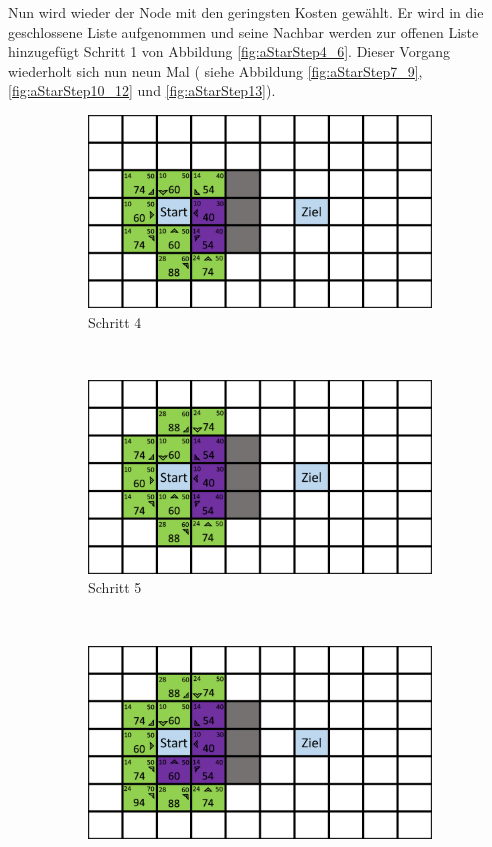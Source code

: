 Nun wird wieder der Node mit den geringsten Kosten gewählt. Er wird in die geschlossene Liste aufgenommen und seine Nachbar werden zur offenen Liste hinzugefügt Schritt 1 von Abbildung \ref{fig:aStarStep4_6}. Dieser Vorgang wiederholt sich nun neun Mal ( siehe Abbildung \ref{fig:aStarStep7_9}, \ref{fig:aStarStep10_12} und \ref{fig:aStarStep13}). 
\begin{figure}[H]
    \centering
    \begin{subfigure}[b]{0.3\textwidth}
        \includegraphics[width=\textwidth]{assets/aStarStep3.png}
        \caption{Schritt 4}
        \label{fig:aStartStep4}
    \end{subfigure}
    ~
    \begin{subfigure}[b]{0.3\textwidth}
        \includegraphics[width=\textwidth]{assets/aStarStep4.png}
        \caption{Schritt 5}
        \label{fig:aStartStep5}
    \end{subfigure}
    ~
    \begin{subfigure}[b]{0.3\textwidth}
        \includegraphics[width=\textwidth]{assets/aStarStep5.png}

\end{subfigure}
\end{figure}
